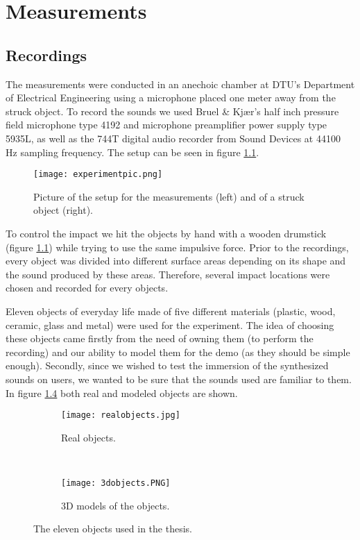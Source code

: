 \chapter{Measurements}\label{ch:measurements}

\section{Recordings}\label{sec:recordings}

The measurements were conducted in an anechoic chamber at DTU's Department of Electrical Engineering using a microphone placed one meter away from the struck object. To record the sounds we used Bruel \& Kjær's half inch pressure field microphone type 4192 and microphone preamplifier power supply type 5935L, as well as the 744T digital audio recorder from Sound Devices at 44100 Hz sampling frequency. The setup can be seen in figure \ref{fig:experiment}.

\begin{figure}[H]
  \centering
    \texttt{[image: experimentpic.png]}
      \caption{Picture of the setup for the measurements (left) and of a struck object (right).}\label{fig:experiment}
\end{figure}

To control the impact we hit the objects by hand with a wooden drumstick (figure \ref{fig:experiment}) while trying to use the same impulsive force. Prior to the recordings, every object was divided into different surface areas depending on its shape and the sound produced by these areas. Therefore, several impact locations were chosen and recorded for every objects.

Eleven objects of everyday life made of five different materials (plastic, wood, ceramic, glass and metal) were used for the experiment. The idea of choosing these objects came firstly from the need of owning them (to perform the recording) and our ability to model them for the demo (as they should be simple enough). Secondly, since we wished to test the immersion of the synthesized sounds on users, we wanted to be sure that the sounds used are familiar to them. In figure \ref{fig:objects} both real and modeled objects are shown. 

\begin{figure}[H]
    \centering
    \begin{subfigure}[b]{0.7\textwidth}
        \texttt{[image: realobjects.jpg]}
        \caption{Real objects.}
        \label{fig:gull}
    \end{subfigure}
    ~ %
    \begin{subfigure}[b]{0.7\textwidth}
        \texttt{[image: 3dobjects.PNG]}
        \caption{3D models of the objects.}
        \label{fig:tiger}
    \end{subfigure}
    \caption{The eleven objects used in the thesis.}\label{fig:objects}
\end{figure}

